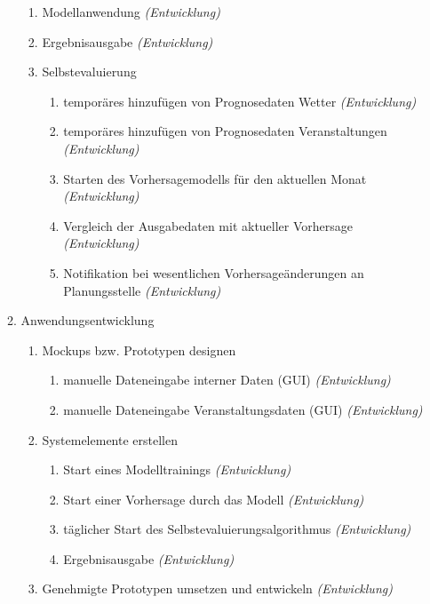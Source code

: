 \begin{enumerate}
\begin{enumerate}
\begin{enumerate}
 				\item Modellanwendung \colorbox{hellrot}{\textit{(Entwicklung)}} 
					\item Ergebnisausgabe \colorbox{hellrot}{\textit{(Entwicklung)}} 
					\item Selbstevaluierung
					\begin{enumerate}
						\item temporäres hinzufügen von Prognosedaten Wetter \colorbox{hellgreen}{\textit{(Entwicklung)}}
						\item temporäres hinzufügen von Prognosedaten Veranstaltungen \colorbox{hellgreen}{\textit{(Entwicklung)}}
						\item Starten des Vorhersagemodells für den aktuellen Monat \colorbox{hellgreen}{\textit{(Entwicklung)}} 
						\item Vergleich der Ausgabedaten mit aktueller Vorhersage \colorbox{hellgreen}{\textit{(Entwicklung)}} 
						\item Notifikation bei wesentlichen Vorhersageänderungen an Planungsstelle  \colorbox{hellgreen}{\textit{(Entwicklung)}}
					\end{enumerate}
				\end{enumerate} 
			\item Anwendungsentwicklung
				\begin{enumerate}
					\item Mockups bzw. Prototypen designen
						\begin{enumerate}
							\item manuelle Dateneingabe interner Daten (GUI) \colorbox{hellrot}{\textit{(Entwicklung)}} 
							\item manuelle Dateneingabe Veranstaltungsdaten (GUI) \colorbox{hellgreen}{\textit{(Entwicklung)}} 
						\end{enumerate}
					\item Systemelemente erstellen
						\begin{enumerate}
							\item Start eines Modelltrainings \colorbox{hellrot}{\textit{(Entwicklung)}} 
							\item Start einer Vorhersage durch das Modell \colorbox{hellrot}{\textit{(Entwicklung)}} 
							\item täglicher Start des Selbstevaluierungsalgorithmus \colorbox{hellgreen}{\textit{(Entwicklung)}} 
							\item Ergebnisausgabe \colorbox{hellrot}{\textit{(Entwicklung)}}
						\end{enumerate}
					\item Genehmigte Prototypen umsetzen und entwickeln \colorbox{hellrot}{\textit{(Entwicklung)}}

\end{enumerate}
\end{enumerate}
\end{enumerate}
